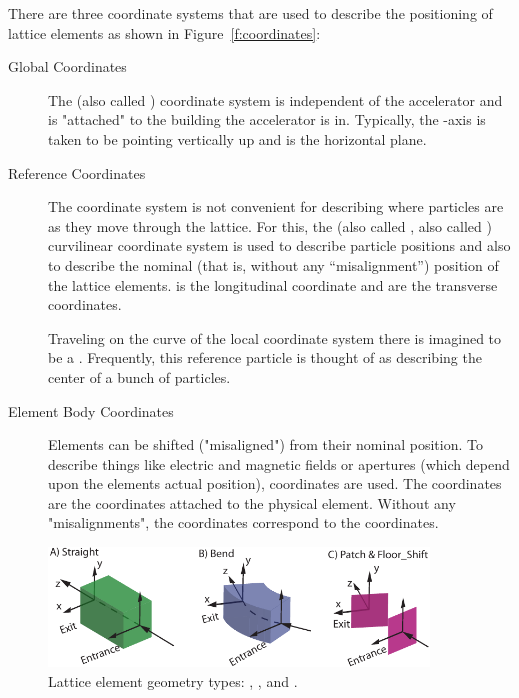 \documentclass{hitec}
\begin{document}
There are three coordinate systems that are used to describe the positioning
of lattice elements as shown in Figure~\ref{f:coordinates}:
\begin{description}
\item[Global Coordinates] \Newline
The   (also called ) coordinate system is independent of the accelerator and is 
"attached" to the building the accelerator is in. Typically, the -axis is taken to be pointing vertically up
and  is the horizontal plane.
\item[Reference Coordinates] \Newline
The  coordinate system is not convenient for describing where particles are as they move
through the lattice. For this, the   (also called , also called
) curvilinear coordinate system is used to describe particle positions and also to
describe the nominal (that is, without any ``misalignment'') position of the lattice elements. 
is the longitudinal coordinate and  are the transverse coordinates.

Traveling on the  curve of the local coordinate system there is imagined to be a
. Frequently, this reference particle is thought of as describing the center
of a bunch of particles.
\item[Element Body Coordinates] \Newline
Elements can be shifted ("misaligned") from their nominal position. To describe things like electric
and magnetic fields or apertures (which depend upon the elements actual position), 
coordinates are used.  The  coordinates are the coordinates attached to the
physical element. Without any "misalignments", the  coordinates correspond to the
 coordinates.
\end{description}

\begin{figure}[tb]
  \centering
  \includegraphics[width=0.9\textwidth]{element-coord-frame.pdf}
  \caption{Lattice element geometry types: , , and .}
  \label{f:body.types}
\end{figure}
\end{document}
